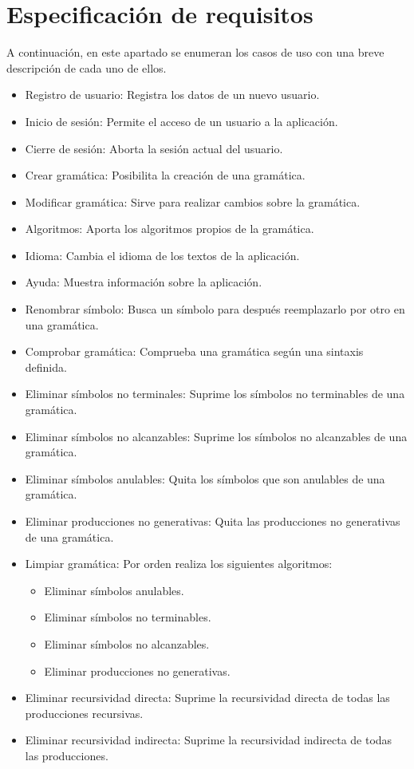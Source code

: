 \section{Especificación de requisitos}

A continuación, en este apartado se enumeran los casos de uso con una breve descripción de cada uno de ellos.

\begin{itemize}

\item Registro de usuario: Registra los datos de un nuevo usuario.
\item Inicio de sesión: Permite el acceso de un usuario a la aplicación.
\item Cierre de sesión: Aborta la sesión actual del usuario.
\item Crear gramática: Posibilita la creación de una gramática.
\item Modificar gramática: Sirve para realizar cambios sobre la gramática.
\item Algoritmos: Aporta los algoritmos propios de la gramática.
\item Idioma: Cambia el idioma de los textos de la aplicación.
\item Ayuda: Muestra información sobre la aplicación.
\item Renombrar símbolo: Busca un símbolo para después reemplazarlo por otro en una gramática.
\item Comprobar gramática: Comprueba una gramática según una sintaxis definida.
\item Eliminar símbolos no terminales: Suprime los símbolos no terminables de una gramática.
\item Eliminar símbolos no alcanzables: Suprime los símbolos no alcanzables de una gramática.
\item Eliminar símbolos anulables: Quita los símbolos que son anulables de una gramática.
\item Eliminar producciones no generativas: Quita las producciones no generativas de una gramática.
\item Limpiar gramática: Por orden realiza los siguientes algoritmos:
\begin{itemize}
	\item Eliminar símbolos anulables.
	\item Eliminar símbolos no terminables.
	\item Eliminar símbolos no alcanzables.
	\item Eliminar producciones no generativas.
\end{itemize}
\item Eliminar recursividad directa: Suprime la recursividad directa de todas las producciones recursivas.
\item Eliminar recursividad indirecta: Suprime la recursividad indirecta de todas las producciones.


\end{itemize}
